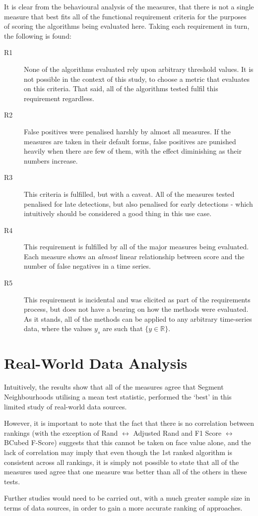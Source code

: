 \documentclass[../main.tex]{subfiles}
\begin{document}
It is clear from the behavioural analysis of the measures, that there is not a single measure that best fits all of the functional requirement criteria for the purposes of scoring the algorithms being evaluated here. Taking each requirement in turn, the following is found:

\begin{description}
    \item[R1] None of the algorithms evaluated rely upon arbitrary threshold values. It is not possible in the context of this study, to choose a metric that evaluates on this criteria. That said, all of the algorithms tested fulfil this requirement regardless.
    \item[R2] False positives were penalised harshly by almost all measures. If the measures are taken in their default forms, false positives are punished heavily when there are few of them, with the effect diminishing as their numbers increase.
    \item[R3] This criteria is fulfilled, but with a caveat. All of the measures tested penalised for late detections, but also penalised for early detections - which intuitively should be considered a good thing in this use case.
    \item[R4] This requirement is fulfilled by all of the major measures being evaluated. Each measure shows an \emph{almost} linear relationship between score and the number of false negatives in a time series.
    \item[R5] This requirement is incidental and was elicited as part of the requirements process, but does not have a bearing on how the methods were evaluated. As it stands, all of the methods can be applied to any arbitrary time-series data, where the values $y_s$ are such that $\{y \in \mathbb{R} \}$.
    \end{description}

\pagebreak

\section{Real-World Data Analysis}

Intuitively, the results show that all of the measures agree that Segment Neighbourhoods utilising a mean test statistic, performed the `best' in this limited study of real-world data sources.

However, it is important to note that the fact that there is no correlation between rankings (with the exception of Rand $\leftrightarrow$ Adjusted Rand and F1 Score $\leftrightarrow$ BCubed F-Score) suggests that this cannot be taken on face value alone, and the lack of correlation may imply that even though the 1st ranked algorithm is consistent across all rankings, it is simply not possible to state that all of the measures used agree that one measure was better than all of the others in these tests.

Further studies would need to be carried out, with a much greater sample size in terms of data sources, in order to gain a more accurate ranking of approaches.
\end{document}
